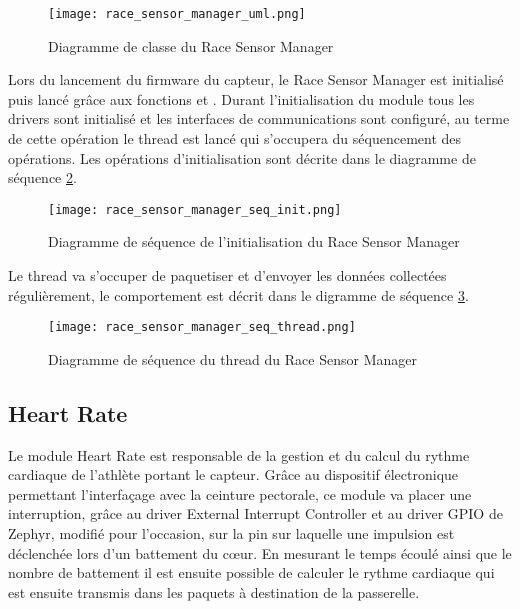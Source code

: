 \begin{figure}[htb]
\centering 
\texttt{[image: race\_sensor\_manager\_uml.png]} 
\caption{Diagramme de classe du Race Sensor Manager}
\label{fig:race_sensor_manager_uml}
\end{figure}

Lors du lancement du firmware du capteur, le Race Sensor Manager est initialisé puis lancé grâce aux fonctions  et . Durant l'initialisation du module tous les drivers sont initialisé et les interfaces de communications sont configuré, au terme de cette opération le thread est lancé qui s'occupera du séquencement des opérations. Les opérations d'initialisation sont décrite dans le diagramme de séquence \ref{fig:race_sensor_manager_init_seq}.

\begin{figure}[htb]
\centering 
\texttt{[image: race\_sensor\_manager\_seq\_init.png]} 
\caption{Diagramme de séquence de l'initialisation du Race Sensor Manager}
\label{fig:race_sensor_manager_init_seq}
\end{figure}

Le thread va s'occuper de paquetiser et d'envoyer les données collectées régulièrement, le comportement est décrit dans le digramme de séquence \ref{fig:race_sensor_manager_init_thread}.

\begin{figure}[htb]
\centering 
\texttt{[image: race\_sensor\_manager\_seq\_thread.png]} 
\caption{Diagramme de séquence du thread du Race Sensor Manager}
\label{fig:race_sensor_manager_init_thread}
\end{figure}

\subsection{Heart Rate}

Le module Heart Rate est responsable de la gestion et du calcul du rythme cardiaque de l'athlète portant le capteur. Grâce au dispositif électronique permettant l'interfaçage avec la ceinture pectorale, ce module va placer une interruption, grâce au driver External Interrupt Controller et au driver GPIO de Zephyr, modifié pour l'occasion, sur la pin sur laquelle une impulsion est déclenchée lors d'un battement du cœur.  En mesurant le temps écoulé ainsi que le nombre de battement il est ensuite possible de calculer le rythme cardiaque qui est ensuite transmis dans les paquets à destination de la passerelle.

